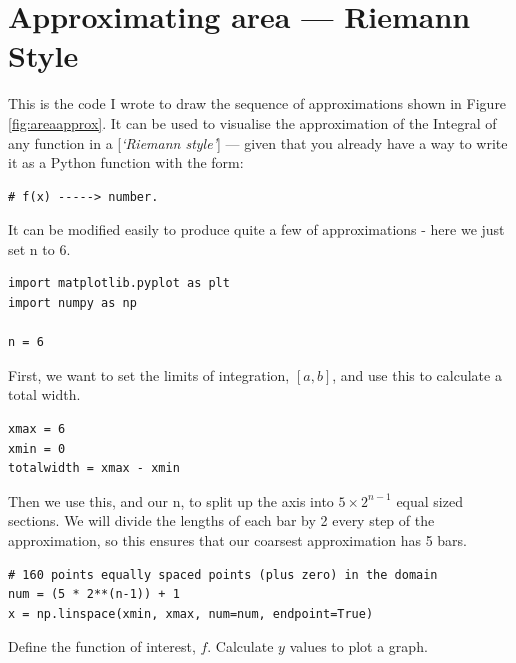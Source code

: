 \section{Approximating area --- Riemann Style}

This is the code I wrote to draw the sequence of approximations shown in Figure \ref{fig:areaapprox}. It can be used to visualise the approximation of the Integral of any function in a [\emph{`Riemann style'}] --- given that you already have a way to write it as a Python function with the form:

\begin{verbatim}
# f(x) -----> number.
\end{verbatim}

It can be modified easily to produce quite a few of approximations - here we just set n to 6.

\begin{verbatim}
import matplotlib.pyplot as plt
import numpy as np 

n = 6
\end{verbatim}

First, we want to set the limits of integration, $[a, b]$, and use this to calculate a total width.

\begin{verbatim}
xmax = 6
xmin = 0
totalwidth = xmax - xmin
\end{verbatim}

Then we use this, and our n, to split up the axis into $5 \times 2^{n-1}$ equal sized sections. We will divide the lengths of each bar by 2 every step of the approximation, so this ensures that our coarsest approximation has 5 bars. 
\begin{verbatim}
# 160 points equally spaced points (plus zero) in the domain
num = (5 * 2**(n-1)) + 1
x = np.linspace(xmin, xmax, num=num, endpoint=True)
\end{verbatim}

Define the function of interest, $f$.
Calculate $y$ values to plot a graph. 

